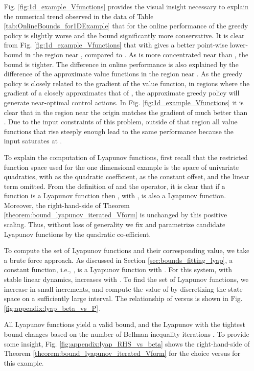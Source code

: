 \documentclass[journal]{IEEEtran}
\begin{document}
Fig. \ref{fig:1d_example_Vfunctions} provides the visual insight necessary to explain the numerical trend observed in the data of Table \ref{tab:OnlineBounds_for1DExample} that for  the online performance of the greedy policy is slightly worse and the bound significantly more conservative.
It is clear from Fig. \ref{fig:1d_example_Vfunctions} that  with  gives a better point-wise lower-bound in the region near , compared to . As  is more concentrated near  than , the bound is tighter.
The difference in online performance is also explained by the difference of the approximate value functions in the region near . As the greedy policy is closely related to the gradient of the value function, in regions where the gradient of a  closely approximates that of , the approximate greedy policy will generate near-optimal control actions.
In Fig. \ref{fig:1d_example_Vfunctions} it is clear that in the region near the origin  matches the gradient of  much better than .
Due to the input constraints of this problem, outside of that region all value functions that rise steeply enough lead to the same performance because the input saturates at .




To explain the computation of Lyapunov functions, first recall that the restricted function space used for the one dimensional example is the space of univariate quadratics, with  as the quadratic coefficient,  as the constant offset, and the linear term omitted.
From the definition of  and the  operator, it is clear that if a function  is a Lyapunov function then , with , is also a Lyapunov function. Moreover, the right-hand-side of Theorem \ref{theorem:bound_lyapunov_iterated_Vform} is unchanged by this positive scaling. Thus, without loss of generality we fix  and parametrize candidate Lyapunov functions by the quadratic co-efficient.


To compute the set of Lyapunov functions and their corresponding  value, we take a brute force approach. As discussed in Section \ref{sec:bounds_fitting_lyap}, a constant function, i.e., , is a Lyapunov function with . For this system, with stable linear dynamics,  increases with . To find the set of Lyapunov functions, we increase  in small increments, and compute the value of  by discretizing the state space on a sufficiently large interval. The relationship of  versus  is shown in Fig. \ref{fig:appendix:lyap_beta_vs_P}.


All Lyapunov functions yield a valid bound, and the Lyapunov with the tightest bound changes based on the number of Bellman inequality iterations . To provide some insight, Fig. \ref{fig:appendix:lyap_RHS_vs_beta} shows the right-hand-side of Theorem \ref{theorem:bound_lyapunov_iterated_Vform} for the choice  versus  for this example.
\end{document}
